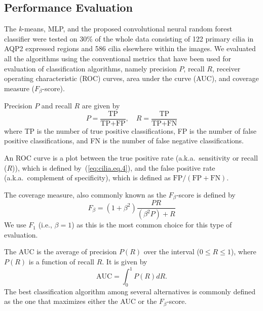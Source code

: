 \subsection{Performance Evaluation}

The \emph{k}-means, MLP, and the proposed convolutional neural random forest classifier were tested on 30\% of the whole data consisting of 122 primary cilia in AQP2 expressed regions and 586 cilia elsewhere within the images. We evaluated all the algorithms using the conventional metrics that have been used for evaluation of classification algorithms, namely precision $P$, recall $R$, receiver operating characteristic (ROC) curves, area under the curve (AUC), and coverage measure ($F_{\beta}$-score).

Precision $P$ and recall $R$ are given by
\begin{equation}
P = \frac{\text{TP}}{\text{TP} + \text{FP}}, \quad R = \frac{\text{TP}}{\text{TP} + \text{FN}}
\label{eq:cilia.eq.4}
\end{equation}
where TP is the number of true positive classifications, FP is the number of false positive classifications, and FN is the number of false negative classifications.

An ROC curve is a plot between the true positive rate (a.k.a.\ sensitivity or recall ($R$)), which is defined by~(\ref{eq:cilia.eq.4}), and the false positive rate (a.k.a.\ complement of specificity), which is defined as $\text{FP}/(\text{FP} + \text{FN})$.

The coverage measure, also commonly known as the $F_{\beta}$-score is defined by
\begin{equation}
F_{\beta} = \left(1 + \beta^{2}\right)\frac{PR}{\left(\beta^{2}P\right) + R}
\label{eq:cilia.eq.5}
\end{equation}
We use $F_{1}$ (i.e., $\beta = 1$) as this is the most common choice for this type of evaluation.

The AUC is the average of precision $P(R)$ over the interval ($0 \leq R \leq 1$), where $P(R)$ is a function of recall $R$. It is given by
\begin{equation}
\text{AUC} = \int_{0}^{1} P(R)dR.
\label{eq:cilia.eq.6}
\end{equation}
The best classification algorithm among several alternatives is commonly defined as the one that maximizes either the AUC  or the $F_{\beta}$-score.


